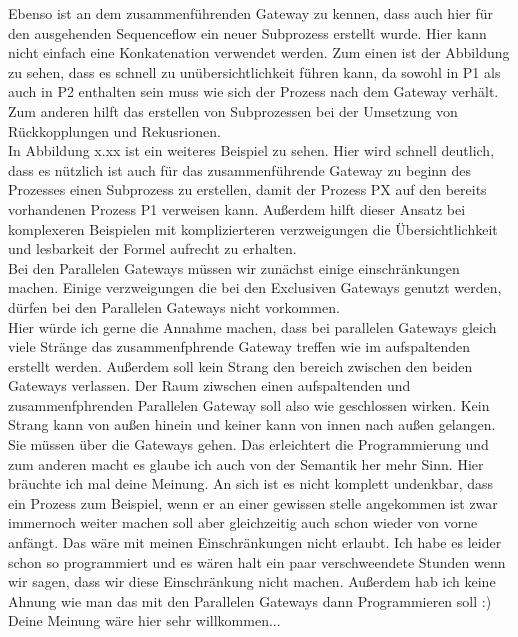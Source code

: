 Ebenso ist an dem zusammenführenden Gateway zu kennen, dass auch hier für den ausgehenden Sequenceflow ein neuer Subprozess erstellt wurde. Hier kann nicht einfach eine Konkatenation verwendet werden. Zum einen ist der Abbildung zu sehen, dass es schnell zu unübersichtlichkeit führen kann, da sowohl in P1 als auch in P2 enthalten sein muss wie sich der Prozess nach dem Gateway verhält. Zum anderen hilft das erstellen von Subprozessen bei der Umsetzung von Rückkopplungen und Rekusrionen.\\
In Abbildung x.xx ist ein weiteres Beispiel zu sehen. Hier wird schnell deutlich, dass es nützlich ist auch für das zusammenführende Gateway zu beginn des Prozesses einen Subprozess zu erstellen, damit der Prozess PX auf den bereits vorhandenen Prozess P1 verweisen kann. Außerdem hilft dieser Ansatz bei komplexeren Beispielen mit komplizierteren verzweigungen die Übersichtlichkeit und lesbarkeit der Formel aufrecht zu erhalten.\\

Bei den Parallelen Gateways müssen wir zunächst einige einschränkungen machen. Einige verzweigungen die bei den Exclusiven Gateways genutzt werden, dürfen bei den Parallelen Gateways nicht vorkommen.\\


Hier würde ich gerne die Annahme machen, dass bei parallelen Gateways gleich viele Stränge das zusammenfphrende Gateway treffen wie im aufspaltenden erstellt werden. Außerdem soll kein Strang den bereich zwischen den beiden Gateways verlassen. Der Raum ziwschen einen aufspaltenden und zusammenfphrenden Parallelen Gateway soll also wie geschlossen wirken. Kein Strang kann von außen hinein und keiner kann von innen nach außen gelangen. Sie müssen über die Gateways gehen. Das erleichtert die Programmierung und zum anderen macht es glaube ich auch von der Semantik her mehr Sinn. Hier bräuchte ich mal deine Meinung. An sich ist es nicht komplett undenkbar, dass ein Prozess zum Beispiel, wenn er an einer gewissen stelle angekommen ist zwar immernoch weiter machen soll aber gleichzeitig auch schon wieder von vorne anfängt. Das wäre mit meinen Einschränkungen nicht erlaubt. Ich habe es leider schon so programmiert und es wären halt ein paar verschweendete Stunden wenn wir sagen, dass wir diese Einschränkung nicht machen. Außerdem hab ich keine Ahnung wie man das mit den Parallelen Gateways dann Programmieren soll :)
Deine Meinung wäre hier sehr willkommen...






